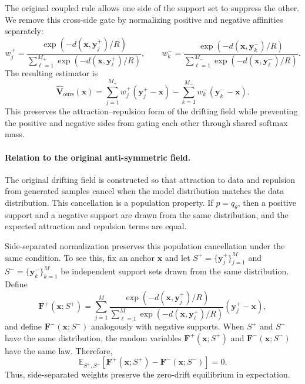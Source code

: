 \documentclass{article}
\newcommand{\F}{\mathbf{F}}
\newcommand{\V}{\mathbf{V}}
\newcommand{\x}{\mathbf{x}}
\newcommand{\yp}{\mathbf{y}^{+}}
\newcommand{\yn}{\mathbf{y}^{-}}
\begin{document}
The original coupled rule allows one side of the support set to suppress the other.
We remove this cross-side gate by normalizing positive and negative affinities separately:
\begin{equation}
w_j^+
=
\frac{\exp(-d(\x,\yp_j)/R)}
{\sum_{\ell=1}^{M_+}\exp(-d(\x,\yp_\ell)/R)},
\qquad
w_k^-
=
\frac{\exp(-d(\x,\yn_k)/R)}
{\sum_{\ell=1}^{M_-}\exp(-d(\x,\yn_\ell)/R)}.
\label{eq:side_separated_weights}
\end{equation}
The resulting estimator is
\begin{equation}
\widehat{\V}_{\mathrm{ours}}(\x)
=
\sum_{j=1}^{M_+}
w_j^+(\yp_j-\x)
-
\sum_{k=1}^{M_-}
w_k^-(\yn_k-\x).
\label{eq:our_estimator}
\end{equation}
This preserves the attraction--repulsion form of the drifting field while preventing the positive and negative sides from gating each other through shared softmax mass.

\paragraph{Relation to the original anti-symmetric field.}
The original drifting field is constructed so that attraction to data and repulsion from generated samples cancel when the model distribution matches the data distribution.
This cancellation is a population property.
If $p=q_\theta$, then a positive support and a negative support are drawn from the same distribution, and the expected attraction and repulsion terms are equal.

Side-separated normalization preserves this population cancellation under the same condition.
To see this, fix an anchor $\x$ and let $S^+=\{\yp_j\}_{j=1}^{M}$ and $S^-=\{\yn_k\}_{k=1}^{M}$ be independent support sets drawn from the same distribution.
Define
\begin{equation}
\F^{+}(\x;S^+)
=
\sum_{j=1}^{M}
\frac{\exp(-d(\x,\yp_j)/R)}
{\sum_{\ell=1}^{M}\exp(-d(\x,\yp_\ell)/R)}
(\yp_j-\x),
\end{equation}
and define $\F^{-}(\x;S^-)$ analogously with negative supports.
When $S^+$ and $S^-$ have the same distribution, the random variables $\F^{+}(\x;S^+)$ and $\F^{-}(\x;S^-)$ have the same law.
Therefore,
\begin{equation}
\mathbb{E}_{S^+,S^-}
\left[
\F^{+}(\x;S^+)-\F^{-}(\x;S^-)
\right]
=
0.
\label{eq:separate_population_cancellation}
\end{equation}
Thus, side-separated weights preserve the zero-drift equilibrium in expectation.
\end{document}
